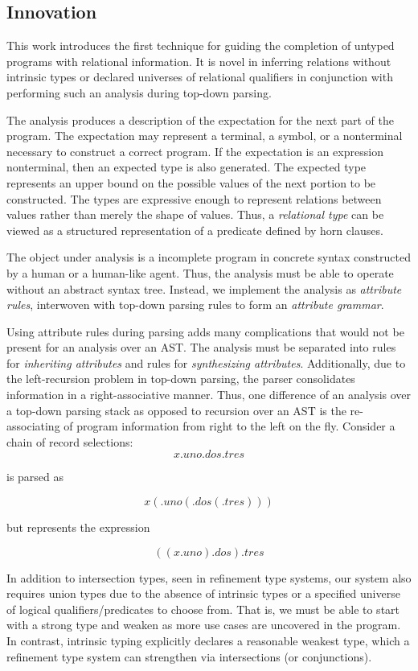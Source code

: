 \documentclass[sigplan,screen,review]{acmart}
\begin{document}
\subsection{Innovation}
This work introduces the first technique for guiding the completion of untyped programs with relational information. 
It is novel in inferring relations without intrinsic types or declared universes of relational qualifiers 
in conjunction with performing such an analysis during top-down parsing.

The analysis produces a description of the expectation for the next part of the program.
The expectation may represent a terminal, a symbol, or 
a nonterminal necessary to construct a correct program. If the expectation is an expression 
nonterminal, then an expected type is also generated. The expected type represents an upper bound
on the possible values of the next portion to be constructed. The types are expressive enough to represent relations 
between values rather than merely the shape of values. Thus, a \textit{relational type} can be viewed 
as a structured representation of a predicate defined by horn clauses. 

The object under analysis is a incomplete program in concrete syntax constructed by a human or a human-like agent. 
Thus, the analysis must be able to operate without an abstract syntax tree. Instead, we implement the analysis 
as \textit{attribute rules}, interwoven with top-down parsing rules to form an \textit{attribute grammar}. 

Using attribute rules during parsing adds many complications that would not be present for an
analysis over an AST. 
The analysis must be separated into rules for \textit{inheriting attributes} and rules for \textit{synthesizing attributes}.
Additionally, due to the left-recursion problem in top-down parsing, 
the parser consolidates information in a right-associative manner.
Thus, one difference of an analysis over a top-down parsing stack as opposed to recursion over an AST is 
the re-associating of program information from right to the left on the fly. 
Consider a chain of record selections:  
\[ 
x.uno.dos.tres 
\]

\noindent is parsed as

\[ 
x(.uno(.dos(.tres)))
\]

\noindent but represents the expression 

\[ 
((x.uno).dos).tres
\]

In addition to intersection types, seen in refinement type systems, our system also requires union types
due to the absence of intrinsic types or a specified universe of logical qualifiers/predicates to choose from. 
That is, we must be able to start with a strong type and weaken as more use cases are uncovered in the program. 
In contrast, intrinsic typing explicitly declares a reasonable weakest type, which a refinement type system  
can strengthen via intersections (or conjunctions).
\end{document}
